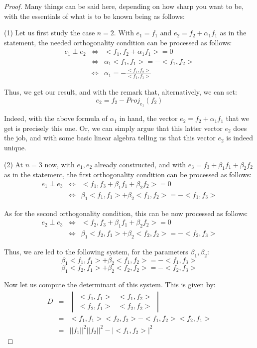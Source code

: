 \documentclass[12pt]{amsbook}
\begin{document}
\begin{proof}
Many things can be said here, depending on how sharp you want to be, with the essentials of what is to be known being as follows:

\medskip

(1) Let us first study the case $n=2$. With $e_1=f_1$ and $e_2=f_2+\alpha_1f_1$ as in the statement, the needed orthogonality condition can be processed as follows:
\begin{eqnarray*}
e_1\perp e_2
&\iff&<f_1,f_2+\alpha_1f_1>=0\\
&\iff&\alpha_1<f_1,f_1>=-<f_1,f_2>\\
&\iff&\alpha_1=-\frac{<f_1,f_2>}{<f_1,f_1>}
\end{eqnarray*}

Thus, we get our result, and with the remark that, alternatively, we can set:
$$e_2=f_2-Proj_{e_1}(f_2)$$

Indeed, with the above formula of $\alpha_1$ in hand, the vector $e_2=f_2+\alpha_1f_1$ that we get is precisely this one. Or, we can simply argue that this latter vector $e_2$ does the job, and with some basic linear algebra telling us that this vector $e_2$ is indeed unique.

\medskip 

(2) At $n=3$ now, with $e_1,e_2$ already constructed, and with $e_3=f_3+\beta_1f_1+\beta_2f_2$ as in the statement, the first orthogonality condition can be processed as follows:
\begin{eqnarray*}
e_1\perp e_3
&\iff&<f_1,f_3+\beta_1f_1+\beta_2f_2>=0\\
&\iff&\beta_1<f_1,f_1>+\beta_2<f_1,f_2>=-<f_1,f_3>
\end{eqnarray*}

As for the second orthogonality condition, this can be now processed as follows:
\begin{eqnarray*}
e_2\perp e_3
&\iff&<f_2,f_3+\beta_1f_1+\beta_2f_2>=0\\
&\iff&\beta_1<f_2,f_1>+\beta_2<f_2,f_2>=-<f_2,f_3>
\end{eqnarray*}

Thus, we are led to the following system, for the parameters $\beta_1,\beta_2$:
$$\beta_1<f_1,f_1>+\beta_2<f_1,f_2>=-<f_1,f_3>$$
$$\beta_1<f_2,f_1>+\beta_2<f_2,f_2>=-<f_2,f_3>$$

Now let us compute the determinant of this system. This is given by:
\begin{eqnarray*}
D
&=&\begin{vmatrix}
<f_1,f_1>&<f_1,f_2>\\
<f_2,f_1>&<f_2,f_2>
\end{vmatrix}\\
&=&<f_1,f_1><f_2,f_2>-<f_1,f_2><f_2,f_1>\\
&=&||f_1||^2||f_2||^2-|<f_1,f_2>|^2
\end{eqnarray*}


\end{proof}
\end{document}

